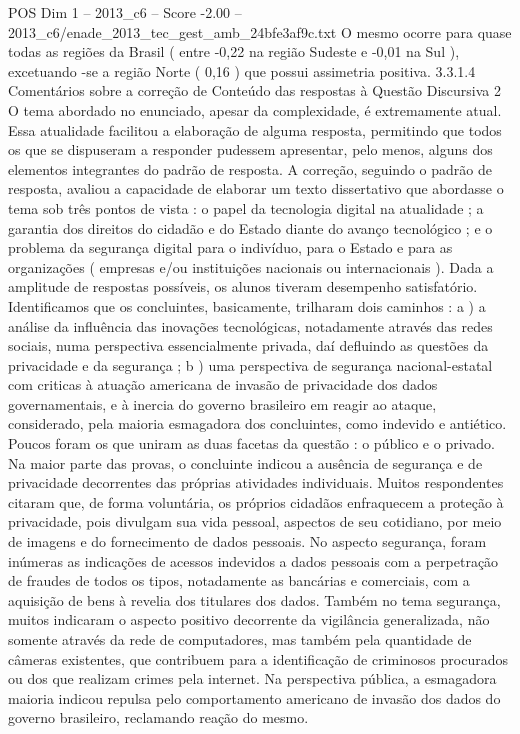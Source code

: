 \begin{textsample}{POS Dim 1 – 2013\_c6 – Score -2.00 – 2013\_c6/enade\_2013\_tec\_gest\_amb\_24bfe3af9c.txt}
O mesmo ocorre para quase todas as regiões da Brasil ( entre -0,22 na região Sudeste e -0,01 na Sul ), excetuando -se a região Norte ( 0,16 ) que possui assimetria positiva. 3.3.1.4 Comentários sobre a correção de Conteúdo das respostas à Questão Discursiva 2 O tema abordado no enunciado, apesar da complexidade, é extremamente atual.
Essa atualidade facilitou a elaboração de alguma resposta, permitindo que todos os que se dispuseram a responder pudessem apresentar, pelo menos, alguns dos elementos integrantes do padrão de resposta.
A correção, seguindo o padrão de resposta, avaliou a capacidade de elaborar um texto dissertativo que abordasse o tema sob três pontos de vista : o papel da tecnologia digital na atualidade ; a garantia dos direitos do cidadão e do Estado diante do avanço tecnológico ; e o problema da segurança digital para o indivíduo, para o Estado e para as organizações ( empresas e/ou instituições nacionais ou internacionais ).
Dada a amplitude de respostas possíveis, os alunos tiveram desempenho satisfatório.
Identificamos que os concluintes, basicamente, trilharam dois caminhos : a ) a análise da influência das inovações tecnológicas, notadamente através das redes sociais, numa perspectiva essencialmente privada, daí defluindo as questões da privacidade e da segurança ; b ) uma perspectiva de segurança nacional-estatal com criticas à atuação americana de invasão de privacidade dos dados governamentais, e à inercia do governo brasileiro em reagir ao ataque, considerado, pela maioria esmagadora dos concluintes, como indevido e antiético.
Poucos foram os que uniram as duas facetas da questão : o público e o privado.
Na maior parte das provas, o concluinte indicou a ausência de segurança e de privacidade decorrentes das próprias atividades individuais.
Muitos respondentes citaram que, de forma voluntária, os próprios cidadãos enfraquecem a proteção à privacidade, pois divulgam sua vida pessoal, aspectos de seu cotidiano, por meio de imagens e do fornecimento de dados pessoais.
No aspecto segurança, foram inúmeras as indicações de acessos indevidos a dados pessoais com a perpetração de fraudes de todos os tipos, notadamente as bancárias e comerciais, com a aquisição de bens à revelia dos titulares dos dados.
Também no tema segurança, muitos indicaram o aspecto positivo decorrente da vigilância generalizada, não somente através da rede de computadores, mas também pela quantidade de câmeras existentes, que contribuem para a identificação de criminosos procurados ou dos que realizam crimes pela internet.
Na perspectiva pública, a esmagadora maioria indicou repulsa pelo comportamento americano de invasão dos dados do governo brasileiro, reclamando reação do mesmo.

\end{textsample}
